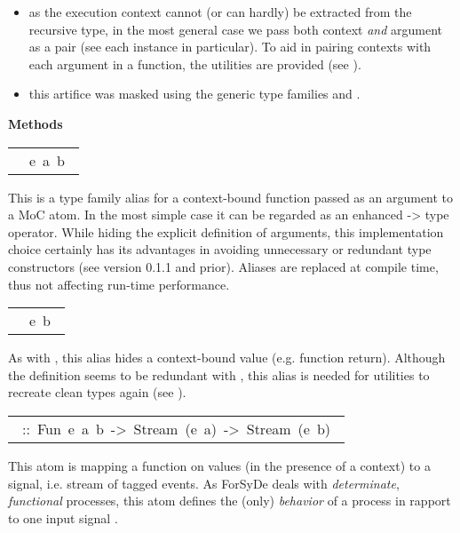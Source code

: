 \begin{haddockdesc}
\begin{itemize}
\item
as the execution context cannot (or can hardly) be extracted from
 the recursive type, in the most general case we pass both context
 \emph{and} argument as a pair (see each instance in particular). To aid
 in pairing contexts with each argument in a function, the 
 utilities are provided (see ).\par

\item
this artifice was masked using the generic type families 
 and . \par

\end{itemize}

\haddockpremethods{}\textbf{Methods}
\begin{haddockdesc}
\item[\begin{tabular}{@{}l}\ \haddockid{Fun}\ e\ a\ b\ \end{tabular}]
\haddockbegindoc
This is a type family alias for a context-bound function passed as an argument to a MoC atom. In the most simple case it can be regarded as an enhanced -> type operator. While hiding the explicit definition of arguments, this implementation choice certainly has its advantages in avoiding unnecessary or redundant type constructors (see version 0.1.1 and prior). Aliases are replaced at compile time, thus not affecting run-time performance.\par

\item[\begin{tabular}{@{}l}\ \haddockid{Ret}\ e\ b\ \end{tabular}]
\haddockbegindoc
As with , this alias hides a context-bound value (e.g. function return). Although the definition seems to be redundant with , this alias is needed for utilities to recreate clean types again (see \haddockid{-*}).\par

\item[\begin{tabular}{@{}l}\haddockid{(-.-)}\ ::\ Fun\ e\ a\ b\ ->\ Stream\ (e\ a)\ ->\ Stream\ (e\ b)\ \end{tabular}]
\haddockbegindoc
This atom is mapping a function on values (in the presence of a context) to a signal, i.e. stream of tagged events. As ForSyDe deals with \emph{determinate}, \emph{functional} processes, this atom defines the (only) \emph{behavior} of a process in rapport to one input signal  \cite{Lee98}.\par


\end{haddockdesc}
\end{haddockdesc}
